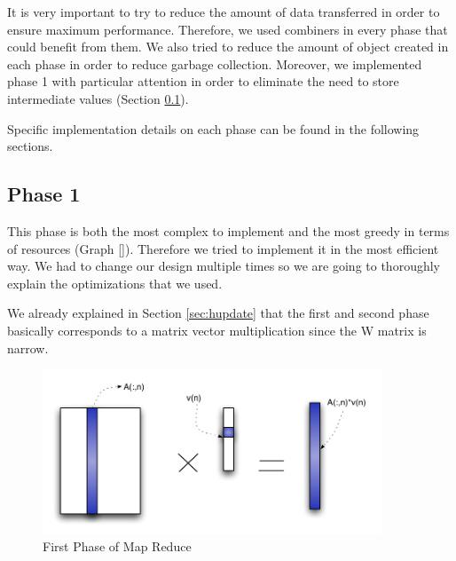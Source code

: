 \documentclass[a4paper,12pt]{article}
\begin{document}
It is very important to try to reduce the amount of data transferred in order to ensure maximum performance.
Therefore, we used combiners in every phase that could benefit from them.
We also tried to reduce the amount of object created in each phase in order to reduce garbage collection.
Moreover, we implemented phase 1 with particular attention in order to eliminate the need to store intermediate values (Section \ref{sec:phase1}).

Specific implementation details on each phase can be found in the following sections.

\subsection{Phase 1}
\label{sec:phase1}

This phase is both the most complex to implement and the most greedy in terms of resources (Graph \ref{}).
Therefore we tried to implement it in the most efficient way.
We had to change our design multiple times so we are going to thoroughly explain the optimizations that we used.

We already explained in Section \ref{sec:hupdate} that the first and second phase basically corresponds to a matrix vector multiplication since the W matrix is narrow.

\begin{center}
	\begin{figure}[h]
	\centering
	\includegraphics[width=0.9\textwidth]{./figures/Map1}
	\caption{First Phase of Map Reduce}
	\label{fig:Map1}
	\end{figure}
\end{center}
\end{document}
